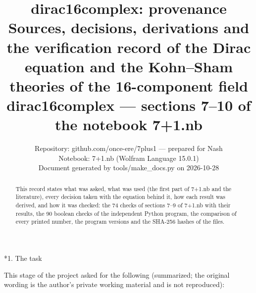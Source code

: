 \documentclass[10pt,a4paper]{article}
\makeatletter
\renewcommand\section{\@startsection{section}{1}{\z@}{-3.5ex \@plus -1ex \@minus -.2ex}{2.3ex \@plus.2ex}{\normalfont\Large\bfseries\raggedright}}
\makeatother
\begin{document}
\title{dirac16complex: provenance\\[0.4em]\large Sources, decisions, derivations and the verification record of the Dirac equation and the Kohn–Sham theories of the 16-component field dirac16complex — sections 7–10 of the notebook 7+1.nb}
\author{Repository: github.com/once-ere/7plus1 — prepared for Nash\\ Notebook: 7+1.nb (Wolfram Language 15.0.1)\\ Document generated by tools/make\_docs.py on 2026-10-28}
\date{}
\maketitle
\begin{abstract}
This record states what was asked, what was used (the first part of 7+1.nb and the literature), every decision taken with the equation behind it, how each result was derived, and how it was checked: the 74 checks of sections 7–9 of 7+1.nb with their results, the 90 boolean checks of the independent Python program, the comparison of every printed number, the program versions and the SHA-256 hashes of the files.
\end{abstract}
\tableofcontents
{}\section*{1. The task}
This stage of the project asked for the following (summarized; the original wording is the author’s private working material and is not reproduced):
\end{document}
